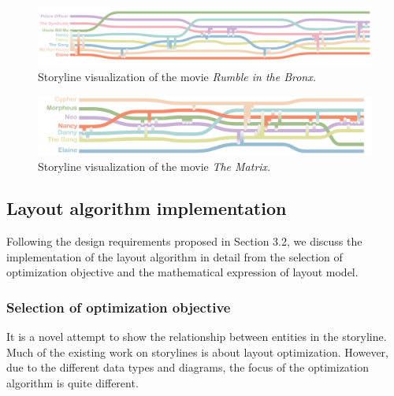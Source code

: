 \documentclass[review,journal]{vgtc}         %
\begin{document}
\begin{figure}[t]
	\centering
	\includegraphics[width=\textwidth]{Fig/hongfanqu.pdf}
	\vspace{-2.5em}
	\caption{ Storyline visualization of the movie \textit{Rumble in the Bronx.} }
	\vspace{-0.5em}
	\label{fig:hfq}
\end{figure}

\begin{figure}[t]
	\centering
	\includegraphics[width=\textwidth]{Fig/matrix.pdf}
	\vspace{-1.5em}
	\caption{Storyline visualization of the movie \textit{The Matrix}. }
	\vspace{-0.5em}
	\label{fig:matrix}
\end{figure}

\subsection{Layout algorithm implementation}
\noindent  Following the design requirements proposed in Section 3.2, we discuss the implementation of the layout algorithm in detail from the selection of optimization objective and the mathematical expression of layout model.

\subsubsection{Selection of optimization objective}
\noindent It is a novel attempt to show the relationship between entities in the storyline. Much of the existing work on storylines is about layout optimization. However, due to the different data types and diagrams, the focus of the optimization algorithm is quite different.
\end{document}
